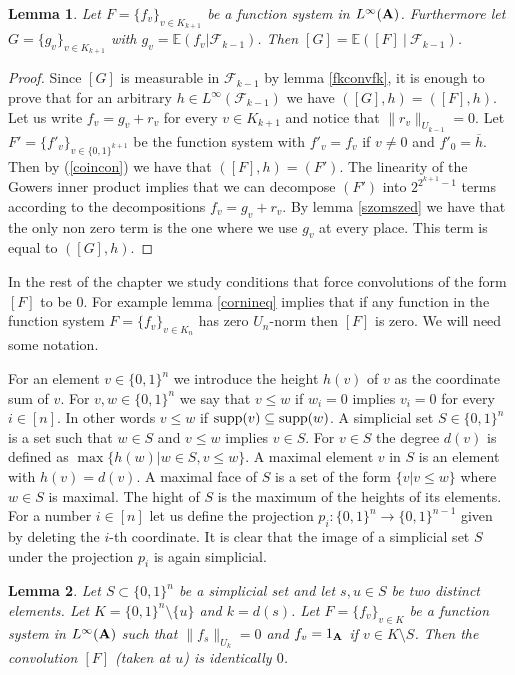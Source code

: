 \documentclass [11pt] {article}
\newtheorem{lemma}{Lemma}[section]
\def\bA{{\bf A}}
\begin{document}
\begin{lemma}\label{vetites1} Let $F=\{f_v\}_{v\in K_{k+1}}$ be a function system in $L^\infty(\bA)$. Furthermore let $G=\{g_v\}_{v\in K_{k+1}}$ with $g_v=\mathbb{E}(f_v|\mathcal{F}_{k-1})$. Then $[G]=\mathbb{E}([F]~|~\mathcal{F}_{k-1})$.
\end{lemma}

\begin{proof} Since $[G]$ is measurable in $\mathcal{F}_{k-1}$ by lemma \ref{fkconvfk}, it is enough to prove that for an arbitrary $h\in L^\infty(\mathcal{F}_{k-1})$ we have $([G],h)=([F],h)$. Let us write $f_v=g_v+r_v$ for every $v\in K_{k+1}$ and notice that $\|r_v\|_{U_{k-1}}=0$. Let $F'=\{f'_v\}_{v\in\{0,1\}^{k+1}}$ be the function system with $f'_v=f_v$ if $v\neq 0$ and $f'_0=\overline{h}$. Then by (\ref{coincon}) we have that $([F],h)=(F')$.
The linearity of the Gowers inner product implies that we can decompose $(F')$ into $2^{2^{k+1}-1}$ terms according to the decompositions $f_v=g_v+r_v$. By lemma \ref{szomszed} we have that the only non zero term is the one where we use $g_v$ at every place. This term is equal to $([G],h)$.
\end{proof}

\medskip

In the rest of the chapter we study conditions that force convolutions of the form $[F]$ to be $0$. For example lemma \ref{cornineq} implies that if any function in the function system $F=\{f_v\}_{v\in K_n}$ has zero $U_n$-norm then $[F]$ is zero. We will need some notation.

For an element $v\in\{0,1\}^n$ we introduce the height $h(v)$ of $v$ as the coordinate sum of $v$. For $v,w\in\{0,1\}^n$ we say that $v\leq w$ if $w_i=0$ implies $v_i=0$ for every $i\in [n]$. In other words $v\leq w$ if ${\rm supp}(v)\subseteq{\rm supp}(w)$. A simplicial set $S\in\{0,1\}^n$ is a set such that $w\in S$ and $v\leq w$ implies $v\in S$. For $v\in S$ the degree $d(v)$ is defined as $\max\{h(w)|w\in S,v\leq w\}$. A maximal element $v$ in $S$ is an element with $h(v)=d(v)$.
A maximal face of $S$ is a set of the form $\{v|v\leq w\}$ where $w\in S$ is maximal.
The hight of $S$ is the maximum of the heights of its elements.
For a number $i\in [n]$ let us define the projection $p_i:\{0,1\}^n\rightarrow\{0,1\}^{n-1}$ given by deleting the $i$-th coordinate. It is clear that the image of a simplicial set $S$ under the projection $p_i$ is again simplicial.  

\begin{lemma}\label{simpzero} Let $S\subset\{0,1\}^n$ be a simplicial set and let $s,u\in S$ be two distinct elements. Let $K=\{0,1\}^n\setminus\{u\}$ and $k=d(s)$. Let $F=\{f_v\}_{v\in K}$ be a function system in $L^\infty(\bA)$ such that $\|f_s\|_{U_k}=0$ and $f_v=1_{\bA}$ if $v\in K\setminus S$.
Then the convolution $[F]$ (taken at $u$) is identically $0$. 
\end{lemma}
\end{document}
